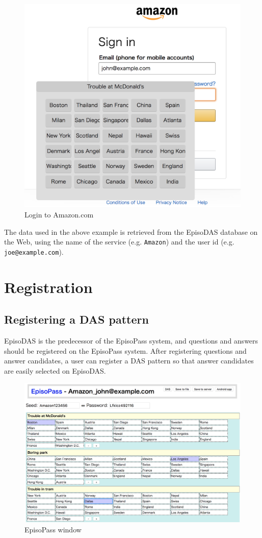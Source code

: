 \documentclass[sigconf]{acmart}
\begin{document}
\begin{figure}[H]
  \includegraphics[width=12cm,bb=0 0 1092 1026]{figures/Amazon.png}
  \caption{Login to Amazon.com}
  \label{Amazon}
\end{figure}

The data used in the above example is retrieved from the EpisoDAS database
on the Web, using the name of the service (e.g. \texttt{Amazon})
and the user id (e.g. \texttt{joe@example.com}).

\section{Registration}

\subsection{Registering a DAS pattern}

EpisoDAS is the predecessor of the EpisoPass system,
and questions and answers should be registered on the EpisoPass system.
After registering questions and answer candidates,
a user can register a DAS pattern so that
answer candidates are easily selected on EpisoDAS.

\begin{figure}[H]
  \includegraphics[width=12cm,bb=0 0 1832 1180]{figures/JohnEpisodes.png}
  \caption{EpisoPass window}
  \label{JohnEpisodes}
\end{figure}
\end{document}
